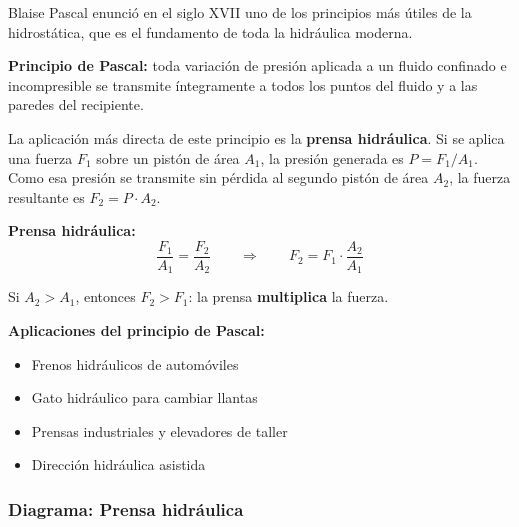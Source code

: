 \begin{seccion}
Blaise Pascal enunció en el siglo XVII uno de los principios más útiles de la hidrostática, que es el fundamento de toda la hidráulica moderna.

\begin{definicion}
\textbf{Principio de Pascal:} toda variación de presión aplicada a un fluido confinado e incompresible se transmite íntegramente a todos los puntos del fluido y a las paredes del recipiente.
\end{definicion}

La aplicación más directa de este principio es la \textbf{prensa hidráulica}. Si se aplica una fuerza $F_1$ sobre un pistón de área $A_1$, la presión generada es $P = F_1/A_1$. Como esa presión se transmite sin pérdida al segundo pistón de área $A_2$, la fuerza resultante es $F_2 = P \cdot A_2$.

\begin{ecuacion}
\textbf{Prensa hidráulica:}
$$\frac{F_1}{A_1} = \frac{F_2}{A_2} \qquad \Longrightarrow \qquad F_2 = F_1 \cdot \frac{A_2}{A_1}$$

Si $A_2 > A_1$, entonces $F_2 > F_1$: la prensa \textbf{multiplica} la fuerza.
\end{ecuacion}

\textbf{Aplicaciones del principio de Pascal:}
\begin{itemize}
    \item Frenos hidráulicos de automóviles
    \item Gato hidráulico para cambiar llantas
    \item Prensas industriales y elevadores de taller
    \item Dirección hidráulica asistida
\end{itemize}
\end{seccion}

\subsubsection{Diagrama: Prensa hidráulica}

